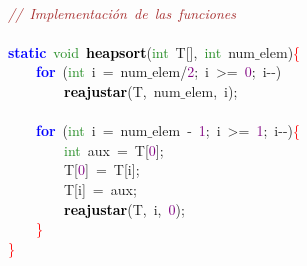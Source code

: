 \mbox{} \\
\mbox{}\textit{\textcolor{Brown}{//\ Implementación\ de\ las\ funciones}} \\
\mbox{} \\
\mbox{}\textbf{\textcolor{Blue}{static}}\ \textcolor{ForestGreen}{void}\ \textbf{\textcolor{Black}{heapsort}}\textcolor{BrickRed}{(}\textcolor{ForestGreen}{int}\ T\textcolor{BrickRed}{[],}\ \textcolor{ForestGreen}{int}\ num$\_$elem\textcolor{BrickRed}{)}\textcolor{Red}{\{} \\
\mbox{}\ \ \ \ \textbf{\textcolor{Blue}{for}}\ \textcolor{BrickRed}{(}\textcolor{ForestGreen}{int}\ i\ \textcolor{BrickRed}{=}\ num$\_$elem\textcolor{BrickRed}{/}\textcolor{Purple}{2}\textcolor{BrickRed}{;}\ i\ \textcolor{BrickRed}{\textgreater{}=}\ \textcolor{Purple}{0}\textcolor{BrickRed}{;}\ i\textcolor{BrickRed}{-\/-)} \\
\mbox{}\ \ \ \ \ \ \ \ \textbf{\textcolor{Black}{reajustar}}\textcolor{BrickRed}{(}T\textcolor{BrickRed}{,}\ num$\_$elem\textcolor{BrickRed}{,}\ i\textcolor{BrickRed}{);} \\
\mbox{} \\
\mbox{}\ \ \ \ \textbf{\textcolor{Blue}{for}}\ \textcolor{BrickRed}{(}\textcolor{ForestGreen}{int}\ i\ \textcolor{BrickRed}{=}\ num$\_$elem\ \textcolor{BrickRed}{-}\ \textcolor{Purple}{1}\textcolor{BrickRed}{;}\ i\ \textcolor{BrickRed}{\textgreater{}=}\ \textcolor{Purple}{1}\textcolor{BrickRed}{;}\ i\textcolor{BrickRed}{-\/-)}\textcolor{Red}{\{} \\
\mbox{}\ \ \ \ \ \ \ \ \textcolor{ForestGreen}{int}\ aux\ \textcolor{BrickRed}{=}\ T\textcolor{BrickRed}{[}\textcolor{Purple}{0}\textcolor{BrickRed}{];} \\
\mbox{}\ \ \ \ \ \ \ \ T\textcolor{BrickRed}{[}\textcolor{Purple}{0}\textcolor{BrickRed}{]}\ \textcolor{BrickRed}{=}\ T\textcolor{BrickRed}{[}i\textcolor{BrickRed}{];} \\
\mbox{}\ \ \ \ \ \ \ \ T\textcolor{BrickRed}{[}i\textcolor{BrickRed}{]}\ \textcolor{BrickRed}{=}\ aux\textcolor{BrickRed}{;} \\
\mbox{}\ \ \ \ \ \ \ \ \textbf{\textcolor{Black}{reajustar}}\textcolor{BrickRed}{(}T\textcolor{BrickRed}{,}\ i\textcolor{BrickRed}{,}\ \textcolor{Purple}{0}\textcolor{BrickRed}{);} \\
\mbox{}\ \ \ \ \textcolor{Red}{\}} \\
\mbox{}\textcolor{Red}{\}} \\
\mbox{} \\
\mbox{} \\
